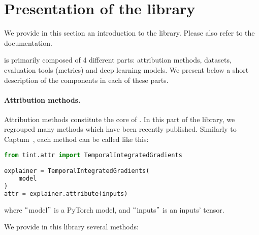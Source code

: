 \section{Presentation of the library}
\label{sec:presentation}

We provide in this section an introduction to the \texttt{} library.
Please also refer to the documentation.

\texttt{} is primarily composed of 4 different parts: attribution methods, datasets,
evaluation tools (metrics) and deep learning models.
We present below a short description of the components in each of these parts.


\paragraph{Attribution methods.}

Attribution methods constitute the core of \texttt{}.
In this part of the library, we regrouped many methods which have been recently published.
Similarly to Captum~\citep{kokhlikyan2020captum}, each method can be called like this:

\begin{lstlisting}[language=Python, caption=Python example, label={lst:attr}]
from tint.attr import TemporalIntegratedGradients

explainer = TemporalIntegratedGradients(
    model
)
attr = explainer.attribute(inputs)
\end{lstlisting}

where $``$model$"$ is a PyTorch model, and $``$inputs$"$ is an inputs' tensor.

We provide in this library several methods:

